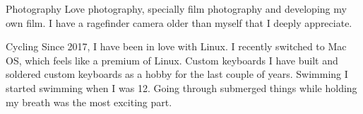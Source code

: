 



\begin{cvskills}
  \cvskill
    {Photography} %
    {Love photography, specially film photography and developing my own film. I have a ragefinder camera older than myself that I deeply appreciate.} %

  \cvskill
    {Cycling} %
    {Since 2017, I have been in love with Linux. I recently switched to Mac OS, which feels like a premium of Linux.} %
  \cvskill
    {Custom keyboards} %
    {I have built and soldered custom keyboards as a hobby for the last couple of years.} %
  \cvskill
    {Swimming} %
    {I started swimming when I was 12. Going through submerged things while holding my breath was the most exciting part.} %

\end{cvskills}